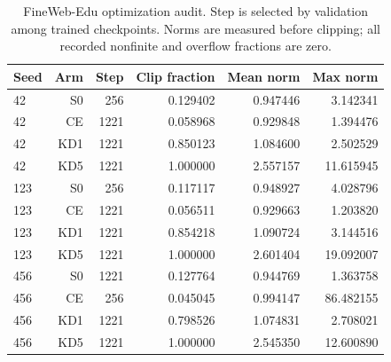 \begin{table}[!t]\centering
\begin{tabular}{lrrrrr}
\toprule
Seed & Arm & Step & Clip fraction & Mean norm & Max norm \\
\midrule
42 & S0 & 256 & 0.129402 & 0.947446 & 3.142341 \\
42 & CE & 1221 & 0.058968 & 0.929848 & 1.394476 \\
42 & KD1 & 1221 & 0.850123 & 1.084600 & 2.502529 \\
42 & KD5 & 1221 & 1.000000 & 2.557157 & 11.615945 \\
123 & S0 & 256 & 0.117117 & 0.948927 & 4.028796 \\
123 & CE & 1221 & 0.056511 & 0.929663 & 1.203820 \\
123 & KD1 & 1221 & 0.854218 & 1.090724 & 3.144516 \\
123 & KD5 & 1221 & 1.000000 & 2.601404 & 19.092007 \\
456 & S0 & 1221 & 0.127764 & 0.944769 & 1.363758 \\
456 & CE & 256 & 0.045045 & 0.994147 & 86.482155 \\
456 & KD1 & 1221 & 0.798526 & 1.074831 & 2.708021 \\
456 & KD5 & 1221 & 1.000000 & 2.545350 & 12.600890 \\
\bottomrule
\end{tabular}
\caption{FineWeb-Edu optimization audit. Step is selected by validation among trained checkpoints. Norms are measured before clipping; all recorded nonfinite and overflow fractions are zero.}\label{tab:modern_optimization}
\end{table}
